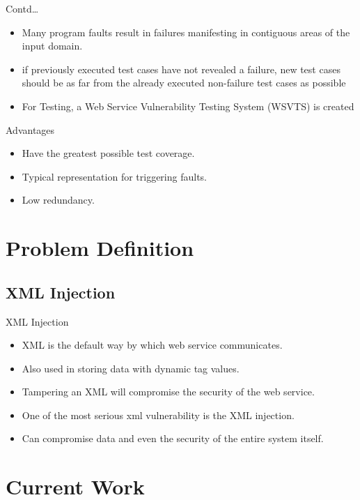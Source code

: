 \documentclass{beamer}
\begin{document}
\begin{frame}{Contd\dots}
	\begin{itemize}
	\item Many program faults result in failures manifesting in contiguous areas of the
	input domain.
	\item if previously executed test cases have not revealed a failure, new
	test cases should be as far from the already executed non-failure test cases as possible
	\item For Testing, a Web Service Vulnerability Testing System (WSVTS)  is created
\end{itemize}
	\begin{block}{Advantages}
		\begin{itemize}
			\item Have the greatest possible test coverage.
			\item Typical representation for triggering faults.
			\item Low redundancy.
		\end{itemize}
	\end{block}
	
\end{frame}

\section{Problem Definition}
\subsection{XML Injection}
\begin{frame}{XML Injection}{}
	\begin{itemize}
		\item XML is the default way by which web service communicates.
		\item Also used in storing data with dynamic tag values.
		\item Tampering an XML will compromise the security of the web service.
		\item One of the most serious xml vulnerability is the XML injection.
		\item Can compromise data and even the security of the entire system itself. 
	\end{itemize}
\end{frame}
\section{Current Work}
\end{document}
